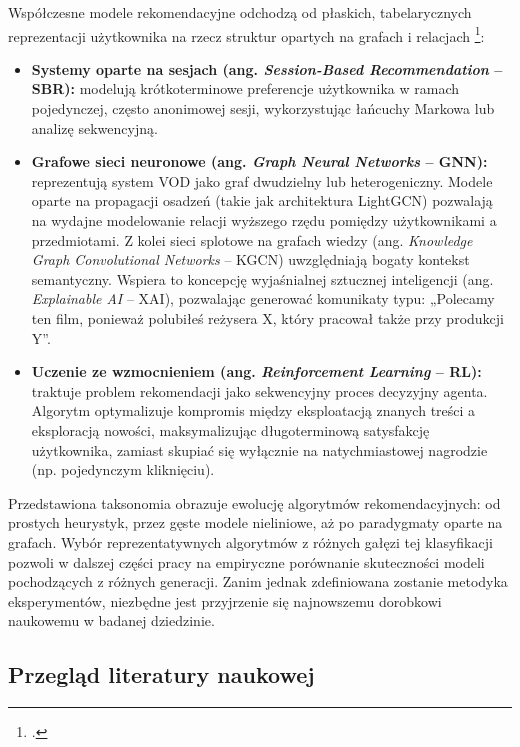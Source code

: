 Współczesne modele rekomendacyjne odchodzą od płaskich, tabelarycznych reprezentacji użytkownika na rzecz struktur opartych na grafach i relacjach \footcite{malinowskiZastosowanieGrafowSieci2021}:
\begin{itemize}
    \item \textbf{Systemy oparte na sesjach (ang. \foreignlanguage{english}{\textit{Session-Based Recommendation}} -- SBR):} modelują krótkoterminowe preferencje użytkownika w ramach pojedynczej, często anonimowej sesji, wykorzystując łańcuchy Markowa lub analizę sekwencyjną.

    \item \textbf{Grafowe sieci neuronowe (ang. \foreignlanguage{english}{\textit{Graph Neural Networks}} -- GNN):} reprezentują system VOD jako graf dwudzielny lub heterogeniczny. Modele oparte na propagacji osadzeń (takie jak architektura LightGCN) pozwalają na wydajne modelowanie relacji wyższego rzędu pomiędzy użytkownikami a przedmiotami. Z kolei sieci splotowe na grafach wiedzy (ang. \foreignlanguage{english}{\textit{Knowledge Graph Convolutional Networks}} -- KGCN) uwzględniają bogaty kontekst semantyczny. Wspiera to koncepcję wyjaśnialnej sztucznej inteligencji (ang. \foreignlanguage{english}{\textit{Explainable AI}} -- XAI), pozwalając generować komunikaty typu: „Polecamy ten film, ponieważ polubiłeś reżysera X, który pracował także przy produkcji Y”.

    \item \textbf{Uczenie ze wzmocnieniem (ang. \foreignlanguage{english}{\textit{Reinforcement Learning}} -- RL):} traktuje problem rekomendacji jako sekwencyjny proces decyzyjny agenta. Algorytm optymalizuje kompromis między eksploatacją znanych treści a eksploracją nowości, maksymalizując długoterminową satysfakcję użytkownika, zamiast skupiać się wyłącznie na natychmiastowej nagrodzie (np. pojedynczym kliknięciu).
\end{itemize}
Przedstawiona taksonomia obrazuje ewolucję algorytmów rekomendacyjnych: od prostych heurystyk, przez gęste modele nieliniowe, aż po paradygmaty oparte na grafach. Wybór reprezentatywnych algorytmów z różnych gałęzi tej klasyfikacji pozwoli w dalszej części pracy na empiryczne porównanie skuteczności modeli pochodzących z różnych generacji. Zanim jednak zdefiniowana zostanie metodyka eksperymentów, niezbędne jest przyjrzenie się najnowszemu dorobkowi naukowemu w badanej dziedzinie.

\subsection{Przegląd literatury naukowej} %

